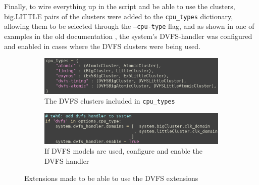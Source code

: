     Finally, to wire everything up in the script and be able to use the
    clusters, big.LITTLE pairs of the clusters were added to the 
    \texttt{cpu\_types} dictionary, allowing them to be selected through the
    \texttt{--cpu-type} flag, and as shown in one of examples in the old 
    documentation \cite{noauthor_experimenting_2019}, the system's DVFS-handler
    was configured and enabled in cases where the DVFS clusters were being used.
    \begin{figure}[H]
        \centering
        \begin{subfigure}{0.9\linewidth}
            \centering
            \includegraphics[width=\textwidth]{screenshots/config-exts/cpu-types.png}
            \caption{The DVFS clusters included in \texttt{cpu\_types}}
        \end{subfigure}
        \begin{subfigure}{0.9\linewidth}
            \centering
            \includegraphics[width=\textwidth]{screenshots/config-exts/dvfs-handler.png}
            \caption{If DVFS models are used, configure and enable the DVFS 
                     handler}
        \end{subfigure}
        \caption{Extensions made to be able to use the DVFS extensions}
    \end{figure}
    
